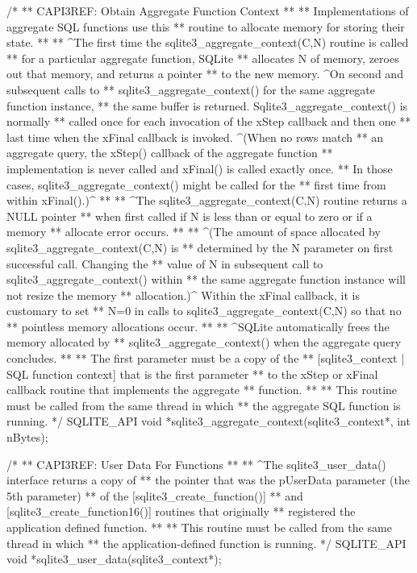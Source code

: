 \begin{Codex}[label=sqlite3.h,numbers=left]
{/*
** CAPI3REF: Obtain Aggregate Function Context
**
** Implementations of aggregate SQL functions use this
** routine to allocate memory for storing their state.
**
** ^The first time the sqlite3_aggregate_context(C,N) routine is called 
** for a particular aggregate function, SQLite
** allocates N of memory, zeroes out that memory, and returns a pointer
** to the new memory. ^On second and subsequent calls to
** sqlite3_aggregate_context() for the same aggregate function instance,
** the same buffer is returned.  Sqlite3_aggregate_context() is normally
** called once for each invocation of the xStep callback and then one
** last time when the xFinal callback is invoked.  ^(When no rows match
** an aggregate query, the xStep() callback of the aggregate function
** implementation is never called and xFinal() is called exactly once.
** In those cases, sqlite3_aggregate_context() might be called for the
** first time from within xFinal().)^
**
** ^The sqlite3_aggregate_context(C,N) routine returns a NULL pointer 
** when first called if N is less than or equal to zero or if a memory
** allocate error occurs.
**
** ^(The amount of space allocated by sqlite3_aggregate_context(C,N) is
** determined by the N parameter on first successful call.  Changing the
** value of N in subsequent call to sqlite3_aggregate_context() within
** the same aggregate function instance will not resize the memory
** allocation.)^  Within the xFinal callback, it is customary to set
** N=0 in calls to sqlite3_aggregate_context(C,N) so that no 
** pointless memory allocations occur.
**
** ^SQLite automatically frees the memory allocated by 
** sqlite3_aggregate_context() when the aggregate query concludes.
**
** The first parameter must be a copy of the
** [sqlite3_context | SQL function context] that is the first parameter
** to the xStep or xFinal callback routine that implements the aggregate
** function.
**
** This routine must be called from the same thread in which
** the aggregate SQL function is running.
*/
SQLITE_API void *sqlite3_aggregate_context(sqlite3_context*, int nBytes);

/*
** CAPI3REF: User Data For Functions
**
** ^The sqlite3_user_data() interface returns a copy of
** the pointer that was the pUserData parameter (the 5th parameter)
** of the [sqlite3_create_function()]
** and [sqlite3_create_function16()] routines that originally
** registered the application defined function.
**
** This routine must be called from the same thread in which
** the application-defined function is running.
*/
SQLITE_API void *sqlite3_user_data(sqlite3_context*);

}
\end{Codex}

